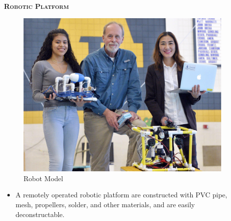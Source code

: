 \documentclass[final,t]{beamer}
\begin{document}
\begin{frame}{}
\begin{columns}
\begin{column}{.33\linewidth}
                \begin{block}{\textsc{\textbf{Robotic Platform}}}
                    \vspace*{3mm}
                    \begin{figure}
                    \centering
                        \includegraphics[scale = 0.5]{assets/group_pic.jpg}
                        \caption{Robot Model}
                    \end{figure}

                    \begin{itemize}
                    	\item A remotely operated robotic platform are constructed with PVC pipe,
                      mesh, propellers, solder, and other materials, and are easily
                      deconstructable.
                    \end{itemize}

                    \vspace*{3mm}
                \end{block}

            \end{column}
            \begin{column}{.33\linewidth}


\end{column}
\end{columns}
\end{frame}
\end{document}
